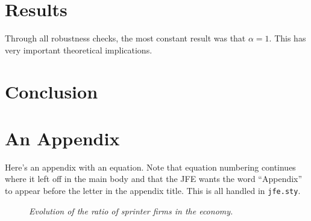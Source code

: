 \documentclass[letterpaper,12pt]{article}
\theoremstyle{definition}
\begin{document}
\section{Results}\label{sec:Results}

Through all robustness checks, the most constant result was that $\alpha = 1$. This has very important theoretical implications. 

\section{Conclusion}\label{sec:Conclusion}



\nocite{*}


\clearpage

\appendix

\section{An Appendix}
\label{sec:app1}

Here's an appendix with an equation. Note that equation numbering continues where it left off in the main body and that the JFE wants the word ``Appendix'' to appear before the letter in the appendix title. This is all handled in \texttt{jfe.sty}.

\begin{figure}[htb]\centering \captionsetup{width=5.8in}
    \caption{\label{fig:CBFirms}\textit{Evolution of the ratio of sprinter firms in the economy.}}
\end{figure}
\end{document}
